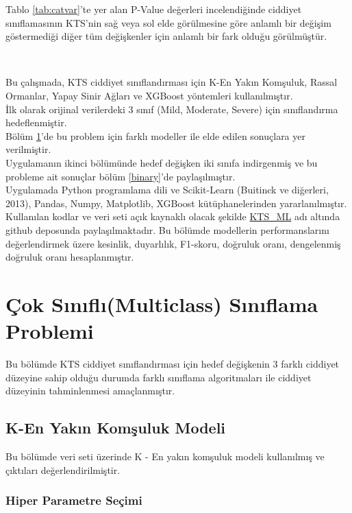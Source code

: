 \documentclass[12pt,twoside]{deuthesis}
\begin{document}
Tablo \ref{tab:catvar}'te yer alan P-Value değerleri incelendiğinde ciddiyet sınıflamasının KTS'nin sağ veya sol elde görülmesine göre anlamlı bir değişim göstermediği diğer tüm değişkenler için anlamlı bir fark olduğu görülmüştür.

~
~

Bu çalışmada, KTS ciddiyet sınıflandırması için K-En Yakın Komşuluk, Rassal Ormanlar, Yapay Sinir Ağları ve XGBoost yöntemleri kullanılmıştır.\\
İlk olarak orijinal verilerdeki 3 sınıf (Mild, Moderate, Severe) için sınıflandırma hedeflenmiştir.\\
Bölüm \ref{multiclass}'de bu problem için farklı modeller ile elde edilen sonuçlara yer verilmiştir.\\
Uygulamanın ikinci bölümünde hedef değişken iki sınıfa indirgenmiş ve bu probleme ait sonuçlar bölüm \ref{binary}'de paylaşılmıştır.\\
Uygulamada Python programlama dili ve Scikit-Learn (Buitinck ve diğerleri, 2013), Pandas, Numpy, Matplotlib, XGBoost kütüphanelerinden yararlanılmıştır. Kullanılan kodlar ve veri seti açık kaynaklı olacak şekilde \href{https://github.com/eyildiztepe/KTS_ML}{KTS\_ML} adı altında github deposunda paylaşılmaktadır.
Bu bölümde modellerin performanslarını değerlendirmek üzere kesinlik, duyarlılık, F1-skoru, doğruluk oranı, dengelenmiş doğruluk oranı hesaplanmıştır.

\hypertarget{multiclass}{%
\section{Çok Sınıflı(Multiclass) Sınıflama Problemi}\label{multiclass}}

Bu bölümde KTS ciddiyet sınıflandırması için hedef değişkenin 3 farklı ciddiyet düzeyine sahip olduğu durumda farklı sınıflama algoritmaları ile ciddiyet düzeyinin tahminlenmesi amaçlanmıştır.

\hypertarget{mult_knn}{%
\subsection{K-En Yakın Komşuluk Modeli}\label{mult_knn}}

Bu bölümde veri seti üzerinde K - En yakın komşuluk modeli kullanılmış ve çıktıları değerlendirilmiştir.

\hypertarget{hiper-parametre-seuxe7imi}{%
\subsubsection{Hiper Parametre Seçimi}\label{hiper-parametre-seuxe7imi}}
\end{document}
